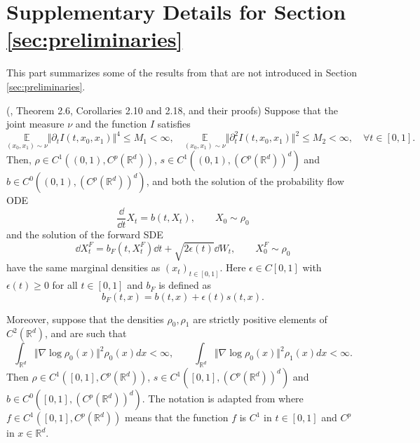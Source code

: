
\section{Supplementary Details for Section \ref{sec:preliminaries}}
\label{appendix:preliminaries}

This part summarizes some of the results from \cite{interpolation} that are not introduced in Section \ref{sec:preliminaries}.

\begin{proposition}
    (\cite{interpolation}, Theorem 2.6, Corollaries 2.10 and 2.18, and their proofs)
    Suppose that the joint measure $\nu$ and the function $I$ satisfies 
    \begin{equation}
        \underset{(x_0,x_1)\sim\nu}{\mathbb{E}}\Vert\partial_tI(t,x_0,x_1)\Vert^4\le M_1<\infty,\quad\underset{(x_0,x_1)\sim\nu}{\mathbb{E}}\Vert\partial_t^2I(t,x_0,x_1)\Vert^2\le M_2<\infty,\quad \forall t\in[0,1].
        \label{eq:assumption1}
    \end{equation}
    Then, $\rho\in C^1((0,1),C^p(\mathbb{R}^d))$, $s\in C^1((0,1),(C^p(\mathbb{R}^d))^d)$ and $b\in C^0((0,1),(C^p(\mathbb{R}^d))^d)$, and both the solution of the probability flow ODE
    $$\frac{\dd}{\dd t}X_t=b(t,X_t), \qquad X_0\sim\rho_0$$
    and the solution of the forward SDE
    $$\dd X_t^F=b_F(t,X_t^F)\dd t+\sqrt{2\epsilon(t)}\dd W_t, \qquad X_0^F\sim\rho_0$$
    have the same marginal densities as $(x_t)_{t\in[0,1]}$. Here $\epsilon\in C[0,1]$ with $\epsilon(t)\ge0$ for all $t\in[0,1]$ and $b_F$ is defined as \begin{equation}
        b_F(t,x)=b(t,x)+\epsilon(t)s(t,x).
        \label{eq:defbf}
    \end{equation}
    
    Moreover, suppose that the densities $\rho_0,\rho_1$ are strictly positive elements of $C^2(\mathbb{R}^d)$, and are such that
    $$\int_{\mathbb{R}^d}\Vert\nabla\log\rho_0(x)\Vert^2\rho_0(x)dx<\infty,\qquad\int_{\mathbb{R}^d}\Vert\nabla\log\rho_0(x)\Vert^2\rho_1(x)dx<\infty.$$
    Then $\rho\in C^1([0,1],C^p(\mathbb{R}^d))$, $s\in C^1([0,1],(C^p(\mathbb{R}^d))^d)$ and $b\in C^0([0,1],(C^p(\mathbb{R}^d))^d)$. The notation is adapted from \cite{interpolation} where $f\in C^1([0,1],C^p(\mathbb{R}^d))$ means that the function $f$ is $C^1$ in $t\in[0,1]$ and $C^p$ in $x\in\mathbb{R}^d$.
    \label{prop:generative-modeling}
\end{proposition}


